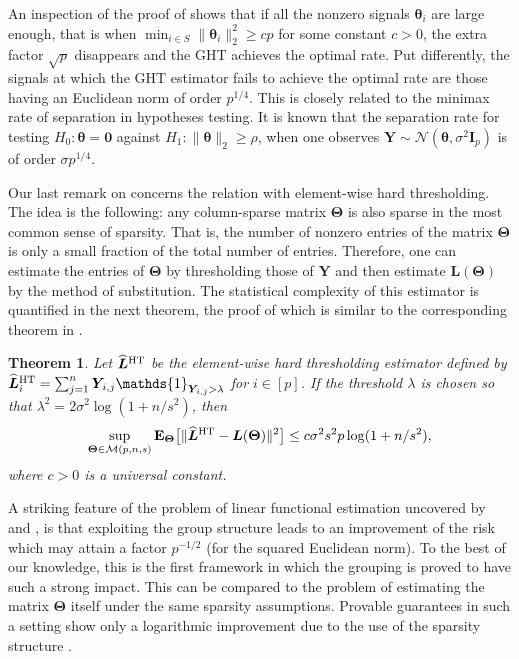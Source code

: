 \documentclass[sts,preprint,reqno,a4paper]{imsart}
\def\l{\lambda}
\def\bt{\boldsymbol\theta}
\def\btheta{\boldsymbol\theta}
\def\bTheta{\boldsymbol\Theta}
\def\bY{\boldsymbol Y\!}
\def\bL{\boldsymbol L}
\def\bfI{\mathbf I}
\def\bfY{\mathbf Y}
\def\bfT{\mathbf\Theta}
\def\fcar{\mathds{1}}
\def\esp{\mathbf E}
\def\calM{\mathcal M}
\def\hat{\widehat}
\theoremstyle{plain}
\newtheorem{theorem}{Theorem}
\theoremstyle{remark}
\theoremstyle{definition}
\begin{document}
An inspection of the proof of  shows that if all the nonzero
signals $\bt_i$ are large enough, that is when $\min_{i\in S}\|\bt_i\|_2^2\ge cp $
for some constant $c>0$, the extra factor $\sqrt{p}$ disappears and the GHT
achieves the optimal rate. Put differently, the signals at which the GHT estimator
fails to achieve the optimal rate are those having an Euclidean norm of order $p^{1/4}$. This is closely related to the minimax rate of separation in hypotheses
testing. It is known that the separation rate for testing $H_0:\btheta=\mathbf 0$
against $H_1:\|\bt\|_2\ge \rho$, when one observes $\bY\sim \mathcal N(\bt, \sigma^2\bfI_p)$ is of order $\sigma p^{1/4}$.

Our last remark on  concerns the relation with element-wise
hard thresholding. The idea is the following: any column-sparse matrix
$\bTheta$ is also sparse in the most common sense of sparsity. That is,
the number of nonzero entries of the matrix $\bTheta$ is only a small fraction
of the total number of entries. Therefore, one can estimate the entries
of $\bTheta$ by thresholding those of $\bfY$ and then estimate $\bL(\bTheta)$
by the method of substitution. The statistical complexity of this estimator
is quantified in the next theorem, the proof of which is similar to the
corresponding theorem in \citep{collier2017}.
\begin{theorem}\label{theorem_BT}
	Let $\hat{\bL}{}^{\rm HT}$ be the element-wise hard thresholding estimator
	defined by $\hat{\bL}{}^{\rm HT}_i = \sum_{j=1}^n \bY_{i,j} \fcar_{\bY_{i,j}>\lambda}$
	for $i\in [p]$. If the threshold $\l$  is chosen so that $\lambda^2=2\sigma^2\log(1+n/s^2)$, then
	\begin{equation}
		\sup_{\bfT\in\calM(p,n,s)}\esp_\bfT\big[\|\hat{\bL}{}^{\rm HT}-\bL(\bfT)\|^2 \big]
		\le c\sigma^2s^2p\log(1+n/s^2),
	\end{equation}
	where $c>0$ is a universal constant.
\end{theorem}

A striking feature of the problem of linear functional estimation
uncovered by  and , is that exploiting the
group structure leads to an improvement of the risk which may attain a factor
$p^{-1/2}$ (for the squared Euclidean norm). To the best of our knowledge, this
is the first framework in which the grouping is proved to have such a strong
impact. This can be compared to the problem of estimating the matrix $\bTheta$
itself under the same sparsity assumptions. Provable guarantees in such a setting
show only a logarithmic improvement due to the use of the sparsity structure
\citep{lounici2011,Bunea2014}.
\end{document}
